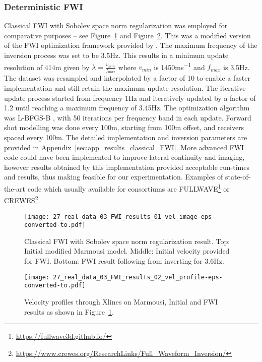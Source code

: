 \subsubsection{Deterministic FWI}\label{sec:results_classical_FWI}
Classical FWI with Sobolev space norm regularization was employed for comparative purposes – see Figure~\ref{fig:marm_classical_fwi} and Figure~\ref{fig:marm_classical_fwi_velocity}. This was a modified version of the FWI optimization framework provided by \cite{Kazei2019}. The maximum frequency of the inversion process was set to be 3.5\si{Hz}. This results in a minimum update resolution of 414m given by $\lambda=\frac{v_{min}}{f_{max}}$ where $v_{min}$ is 1450\si{ms^{-1}} and $f_{max}$ is 3.5\si{Hz}. The dataset was resampled and interpolated by a factor of 10 to enable a faster implementation and still retain the maximum update resolution. The iterative update process started from frequency 1\si{Hz} and iteratively updated by a factor of 1.2 until reaching a maximum frequency of 3.45\si{Hz}. The optimization algorithm was L-BFGS-B \citep{Zhu1997}, with 50 iterations per frequency band in each update. Forward shot modelling was done every 100m, starting from 100m offset, and receivers spaced every 100m. The detailed implementation and inversion parameters are provided in Appendix~\ref{sec:app_results_classical_FWI}. More advanced FWI code could have been implemented to improve lateral continuity and imaging, however results obtained by this implementation provided acceptable run-times and results, thus making feasible for our experimentation. Examples of state-of-the-art code which usually available for consortiums are FULLWAVE\footnote{\url{https://fullwave3d.github.io/}}
or CREWES\footnote{\url{https://www.crewes.org/ResearchLinks/Full_Waveform_Inversion/}}.

\begin{figure}[ht!]
    \centering
    \texttt{[image: 27\_real\_data\_03\_FWI\_results\_01\_vel\_image-eps-converted-to.pdf]}
    \caption[Classical FWI with Sobolev space norm regularization.]{Classical FWI with Sobolev space norm regularization result. Top: Initial modified Marmousi model. Middle: Initial velocity provided for FWI. Bottom: FWI result following from inverting for 3.6\si{Hz}.}
    \label{fig:marm_classical_fwi}
\end{figure}

\begin{figure}[ht!]
    \centering
    \texttt{[image: 27\_real\_data\_03\_FWI\_results\_02\_vel\_profile-eps-converted-to.pdf]}
    \caption[Velocity profiles through Xlines on Marmousi, Initial and FWI results.]{Velocity profiles through Xlines on Marmousi, Initial and FWI results as shown in Figure~\ref{fig:marm_classical_fwi}.}
    \label{fig:marm_classical_fwi_velocity}
\end{figure}

